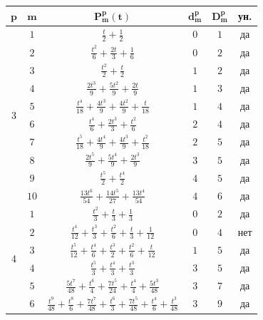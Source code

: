 \documentclass[14pt, a4paper, russian]{report}
\begin{document}
\begin{table}[H]
\begin{small}
\begin{center}
\begin{tabular}{|c|c|c|c|c|c|}
\hline
$\mathbf{p}$ & $\mathbf{m}$& $\mathbf{P_m^p(t)}$ & $\mathbf{d_m^p}$ & $\mathbf{D_m^p}$& \textbf{ун.}\\
\hline
\multirow{10}{*}{3} & $1$ & $\frac{t}{2} + \frac{1}{2}$ & $0$  & $1$ & да \\
                    & $2$ &  $\frac{t^2}{6}+\frac{2 t}{3}+\frac{1}{6}$ & $0$ & $2$ & да \\
                    & $3$ &  $\frac{t^2}{2}+\frac{t}{2}$ & $1$ & $2$ & да \\
                    & $4$ &  $\frac{2 t^3}{9}+\frac{5 t^2}{9}+\frac{2 t}{9} $& $1$ & $3$ & да\\
                    & $5$ & $\frac{t^4}{18}+\frac{4 t^3}{9}+\frac{4 t^2}{9}+\frac{t}{18}$ & $1$ & $4$ & да \\
                   & $6$ & $\frac{t^4}{6}+\frac{2 t^3}{3}+\frac{t^2}{6}$ & $2$ & $4$ & да \\
                   & $7$ & $\frac{t^5}{18}+\frac{4 t^4}{9}+\frac{4 t^3}{9}+\frac{t^2}{18}$ & $2$ & $5$ & да \\
                   & $8$ & $\frac{2 t^5}{9}+\frac{5 t^4}{9}+\frac{2 t^3}{9}$ & $3$ & $5$ & да \\
                   & $9$ & $\frac{t^5}{2}+\frac{t^4}{2}$ & $4$ & $5$ & да \\
                   & $10$ & $\frac{13 t^6}{54}+\frac{14 t^5}{27}+\frac{13 t^4}{54}$ & $4$ & $6$ & да \\
\hline
\multirow{10}{*}{4} & $1$ & $\frac{t^2}{3}+\frac{t}{3}+\frac{1}{3}$ & $0$  & $2$ & да \\
                    & $2$ &  $\frac{t^4}{12}+\frac{t^3}{3}+\frac{t^2}{6}+\frac{t}{3}+\frac{1}{12}$ & $0$ & $4$ & нет \\
                    & $3$ &  $\frac{t^5}{12}+\frac{t^4}{6}+\frac{t^3}{2}+\frac{t^2}{6}+\frac{t}{12}$ & $1$ & $5$ & да \\
                    & $4$ &  $\frac{t^5}{3}+\frac{t^4}{3}+\frac{t^3}{3}$& $3$ & $5$ & да \\
                    & $5$ & $\frac{5 t^7}{48}+\frac{t^6}{4}+\frac{7 t^5}{24}+\frac{t^4}{4}+\frac{5 t^3}{48}$ & $3$ & $7$ & да\\
                    & $6$ & $\frac{t^9}{48}+\frac{t^8}{6}+\frac{7 t^7}{48}+\frac{t^6}{3}+\frac{7 t^5}{48}+\frac{t^4}{6}+\frac{t^3}{48}$ & $3$ & $9$ & да  \\

\end{tabular}
\end{center}
\end{small}
\end{table}
\end{document}
